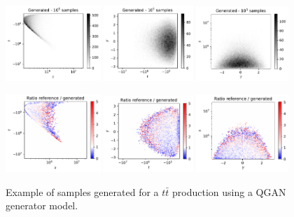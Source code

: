 \documentclass[twocolumn,preprintnumbers,superscriptaddress]{revtex4-2}
\begin{document}
\begin{figure}
  \includegraphics[width=0.32\textwidth]{plots/LHCttbar/s-t_FAKE_100k.pdf}%
  \includegraphics[width=0.3\textwidth]{plots/LHCttbar/t-y_FAKE_100k.pdf}%
  \includegraphics[width=0.31\textwidth]{plots/LHCttbar/y-s_FAKE_100k.pdf}

  \includegraphics[width=0.32\textwidth]{plots/LHCttbar/s-t_RATIO_100k.pdf}%
  \includegraphics[width=0.3\textwidth]{plots/LHCttbar/t-y_RATIO_100k.pdf}%
  \includegraphics[width=0.31\textwidth]{plots/LHCttbar/y-s_RATIO_100k.pdf}

  \caption{\label{fig:ttbar}Example of samples generated for a $t\bar{t}$
    production using a QGAN generator model.}
\end{figure}
\end{document}
